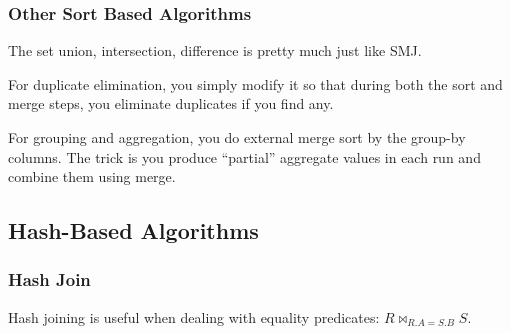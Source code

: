   \subsubsection{Other Sort Based Algorithms}

    The set union, intersection, difference is pretty much just like SMJ. 

    For duplicate elimination, you simply modify it so that during both the sort and merge steps, you eliminate duplicates if you find any. 

    For grouping and aggregation, you do external merge sort by the group-by columns. The trick is you produce ``partial'' aggregate values in each run and combine them using merge. 

\subsection{Hash-Based Algorithms}

  \subsubsection{Hash Join} 

    Hash joining is useful when dealing with equality predicates: $R \bowtie_{R.A = S.B} S$. 

